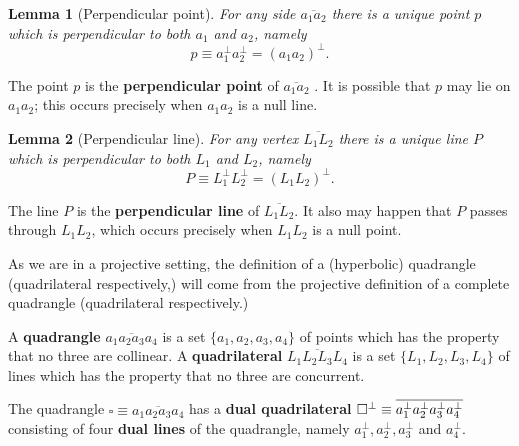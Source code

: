 \documentclass[11pt]{article}
\newtheorem{theorem}{Theorem}
\newtheorem{theorem}{Lemma}
\begin{document}
\begin{theorem}[Perpendicular point]
For any side $\overline{a_{1}a_{2}}$ there is a unique point $p$ which is
perpendicular to both $a_{1}$ and $a_{2}$, namely 
\begin{equation*}
p\equiv a_{1}^{\perp}a_{2}^{\perp}=(a_{1}a_{2})^{\perp}.
\end{equation*}
\end{theorem}

The point $p$ is the \textbf{perpendicular point} of $\overline{a_{1}a_{2}}$%
. It is possible that $p$ may lie on $a_{1}a_{2}$; this occurs precisely
when $a_{1}a_{2}$ is a null line.\newline

\begin{theorem}[Perpendicular line]
For any vertex $\overline{L_{1}L_{2}}$ there is a unique line $P$ which is
perpendicular to both $L_{1}$ and $L_{2}$, namely 
\begin{equation*}
P\equiv L_{1}^{\perp}L_{2}^{\perp}=(L_{1}L_{2})^{\perp}.
\end{equation*}
\end{theorem}

The line $P$ is the \textbf{perpendicular line} of $\overline{L_{1}L_{2}}$.
It also may happen that $P$ passes through $L_{1}L_{2}$, which occurs
precisely when $L_{1}L_{2}$ is a null point.\newline

\pagebreak

As we are in a projective setting, the definition of a (hyperbolic)
quadrangle (quadrilateral respectively,) will come from the projective
definition of a complete quadrangle (quadrilateral respectively.)\newline

A \textbf{quadrangle} $\overline{a_{1}a_{2}a_{3}a_{4}}$ is a set $%
\{a_{1},a_{2},a_{3},a_{4}\}$ of points which has the property that no three
are collinear. A \textbf{quadrilateral} $\overline{L_{1}L_{2}L_{3}L_{4}}$ is
a set $\{L_{1},L_{2},L_{3},L_{4}\}$ of lines which has the property that no
three are concurrent.\newline

The quadrangle $\square\equiv \overline{a_{1}a_{2}a_{3}a_{4}}$ has a \textbf{%
dual quadrilateral} $\square^{\perp}\equiv\overline{a_{1}^{\perp}a_{2}^{%
\perp}a_{3}^{\perp}a_{4}^{\perp}}$ consisting of four \textbf{dual lines} of
the quadrangle, namely $a_{1}^{\perp},a_{2}^{\perp},a_{3}^{\perp}$ and $%
a_{4}^{\perp}$.\newline
\end{document}
